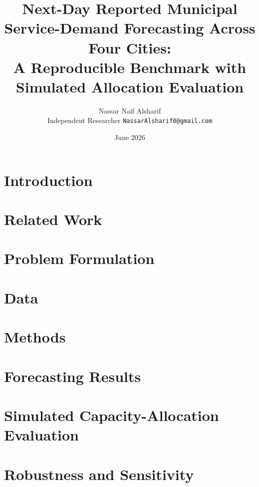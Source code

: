 \documentclass[11pt]{article}
\title{Next-Day Reported Municipal Service-Demand Forecasting Across Four
Cities:\\
\large A Reproducible Benchmark with Simulated Allocation Evaluation}
\author{Nassar Naif Alsharif\\
\small Independent Researcher \quad \texttt{NassarAlsharif0@gmail.com}}
\date{June 2026}
\begin{document}
\maketitle

\begin{abstract}

\end{abstract}

\section{Introduction}\label{sec:intro}


\section{Related Work}\label{sec:related}


\section{Problem Formulation}\label{sec:formulation}


\section{Data}\label{sec:data}


\section{Methods}\label{sec:methods}


\section{Forecasting Results}\label{sec:forecast}


\section{Simulated Capacity-Allocation Evaluation}\label{sec:decision}


\section{Robustness and Sensitivity}\label{sec:robust}

\end{document}

